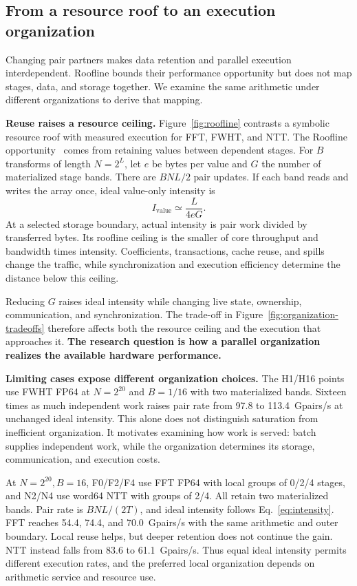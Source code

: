 \subsection{From a resource roof to an execution organization}
\label{sec:motivation}
Changing pair partners makes data retention and parallel execution
interdependent. Roofline bounds their performance opportunity but does not
map stages, data, and storage together. We examine the same arithmetic under
different organizations to derive that mapping.

\noindent\textbf{Reuse raises a resource ceiling.}
Figure~\ref{fig:roofline} contrasts a symbolic resource roof with measured
execution for FFT, FWHT, and NTT. The Roofline opportunity~\cite{roofline}
comes from retaining values between dependent stages.
For $B$ transforms of
length $N=2^L$, let $e$ be bytes per value and $G$ the number of materialized
stage bands. There are $BNL/2$ pair updates. If each band reads and writes
the array once, ideal value-only intensity is
\begin{equation}
I_{\mathrm{value}}\simeq\frac{L}{4eG}.
\label{eq:intensity}
\end{equation}
At a selected storage boundary, actual intensity is pair work divided by
transferred bytes. Its roofline ceiling is the smaller of core throughput and
bandwidth times intensity. Coefficients, transactions, cache reuse, and spills
change the traffic, while synchronization and execution efficiency determine
the distance below this ceiling.

Reducing $G$ raises ideal intensity while changing live state, ownership,
communication, and synchronization. The trade-off in
Figure~\ref{fig:organization-tradeoffs} therefore affects both the resource
ceiling and the execution that approaches it.
\textbf{The research question is how a parallel organization realizes the
available hardware performance.}

\noindent\textbf{Limiting cases expose different organization choices.}
The H1/H16 points use FWHT FP64 at $N=2^{20}$ and $B=1/16$ with two
materialized bands. Sixteen times as much independent work raises pair rate
from 97.8 to 113.4~Gpairs/s at unchanged ideal intensity. This alone does not distinguish saturation from inefficient organization.
It motivates examining how work is served: batch supplies independent work,
while the organization determines its storage, communication, and execution
costs.

At $N=2^{20}, B=16$, F0/F2/F4 use FFT FP64 with local groups of 0/2/4
stages, and N2/N4 use word64 NTT with groups of 2/4. All retain two
materialized bands. Pair rate is $BNL/(2T)$, and ideal intensity follows
Eq.~\ref{eq:intensity}. FFT reaches 54.4, 74.4, and 70.0~Gpairs/s with the
same arithmetic and outer boundary. Local reuse helps, but deeper retention
does not continue the gain. NTT instead falls from 83.6 to 61.1~Gpairs/s.
Thus equal ideal intensity permits different execution rates, and the preferred
local organization depends on arithmetic service and resource use.

